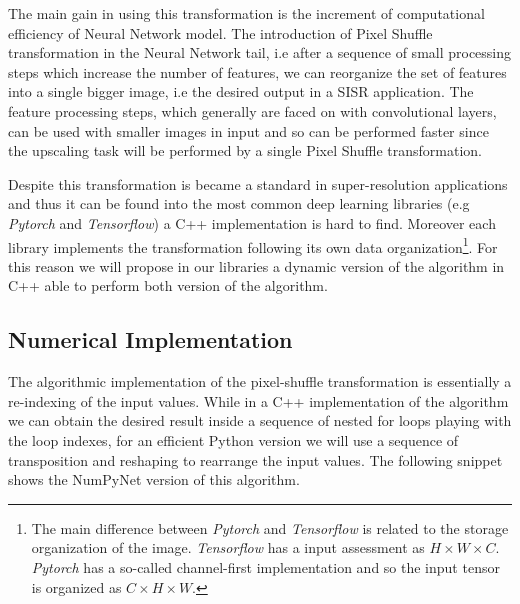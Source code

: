 \documentclass{standalone}
\begin{document}
The main gain in using this transformation is the increment of computational efficiency of Neural Network model.
The introduction of Pixel Shuffle transformation in the Neural Network tail, i.e after a sequence of small processing steps which increase the number of features, we can reorganize the set of features into a single bigger image, i.e the desired output in a SISR application.
The feature processing steps, which generally are faced on with convolutional layers, can be used with smaller images in input and so can be performed faster since the upscaling task will be performed by a single Pixel Shuffle transformation.

Despite this transformation is became a standard in super-resolution applications and thus it can be found into the most common deep learning libraries (e.g \emph{Pytorch} and \emph{Tensorflow}) a C++ implementation is hard to find.
Moreover each library implements the transformation following its own data organization\footnote{
  The main difference between \emph{Pytorch} and \emph{Tensorflow} is related to the storage organization of the image.
  \emph{Tensorflow} has a  input assessment as $H \times W \times C$.
  \emph{Pytorch} has a so-called channel-first implementation and so the input tensor is organized as $C \times H \times W$.
}.
For this reason we will propose in our libraries a dynamic version of the algorithm in C++ able to perform both version of the algorithm.


\subsection[Numerical Implementation]{Numerical Implementation}\label{shuffle_num}

The algorithmic implementation of the pixel-shuffle transformation is essentially a re-indexing of the input values.
While in a C++ implementation of the algorithm we can obtain the desired result inside a sequence of nested for loops playing with the loop indexes, for an efficient Python version we will use a sequence of transposition and reshaping to rearrange the input values.
The following snippet shows the NumPyNet version of this algorithm.
\end{document}
